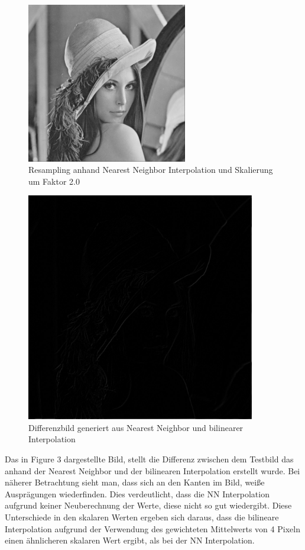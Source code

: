 \documentclass[12pt,german]{article}
\begin{document}
\begin{figure}[H]
	\centering
	\includegraphics[width=7cm]{images/bilineare-interpolation-final/nn-scaled-2.jpeg}
	\caption{Resampling anhand Nearest Neighbor Interpolation und Skalierung um Faktor 2.0}
	\label{fig:resultResamplingNNInterpolation-2.0}
\end{figure}

\begin{figure}[H]
	\centering
	\includegraphics[width=10cm]{images/bilineare-interpolation-final/differenz-bilinear-2.jpg}
	\caption{Differenzbild generiert aus Nearest Neighbor und bilinearer Interpolation}
	\label{fig:resultResamplingDifference}
\end{figure}

Das in Figure 3 dargestellte Bild, stellt die Differenz zwischen dem Testbild das anhand der Nearest Neighbor und der bilinearen Interpolation erstellt wurde. Bei näherer Betrachtung sieht man, dass sich an den Kanten im Bild, weiße Ausprägungen wiederfinden. Dies verdeutlicht, dass die NN Interpolation aufgrund keiner Neuberechnung der Werte, diese nicht so gut wiedergibt. Diese Unterschiede in den skalaren Werten ergeben sich daraus, dass die bilineare Interpolation aufgrund der Verwendung des gewichteten Mittelwerts von 4 Pixeln einen ähnlicheren skalaren Wert ergibt, als bei der NN Interpolation.
\end{document}
